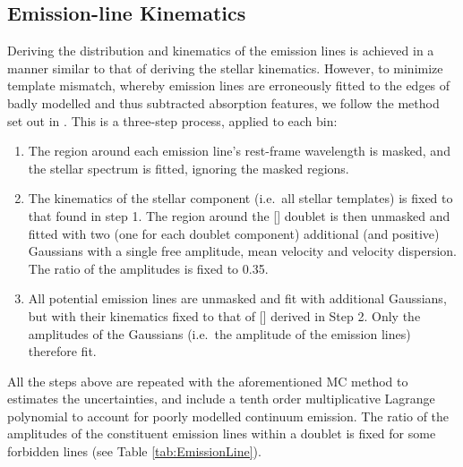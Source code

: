 

	\subsection{Emission-line Kinematics}
		\label{subsec:EmissionFit}
		Deriving the distribution and kinematics of the emission lines is achieved in a manner similar to that of deriving the stellar kinematics. However, to minimize template mismatch, whereby emission lines are erroneously fitted to the edges of badly modelled and thus subtracted absorption features, we follow the method set out in \citet{Sarzi2005}. This is a three-step process, applied to each bin:
		\begin{enumerate}
			\item The region around each emission line's rest-frame wavelength is masked, and the stellar spectrum is fitted, ignoring the masked regions.
			\item The kinematics of the stellar component (i.e.\ all stellar templates) is fixed to that found in step 1. The region around the [] doublet is then unmasked and fitted with two (one for each doublet component) additional (and positive) Gaussians with a single free amplitude, mean velocity and velocity dispersion. The ratio of the amplitudes is fixed to 0.35.
			\item All potential emission lines are unmasked and fit with additional Gaussians, but with their kinematics fixed to that of [] derived in Step 2. Only the amplitudes of the Gaussians (i.e.\ the amplitude of the emission lines) therefore fit. 
		\end{enumerate}
		All the steps above are repeated with the aforementioned MC method to estimates the uncertainties, and include a tenth order multiplicative Lagrange polynomial to account for poorly modelled continuum emission. The ratio of the amplitudes of the constituent emission lines within a doublet is fixed for some forbidden lines (see Table \ref{tab:EmissionLine}).

